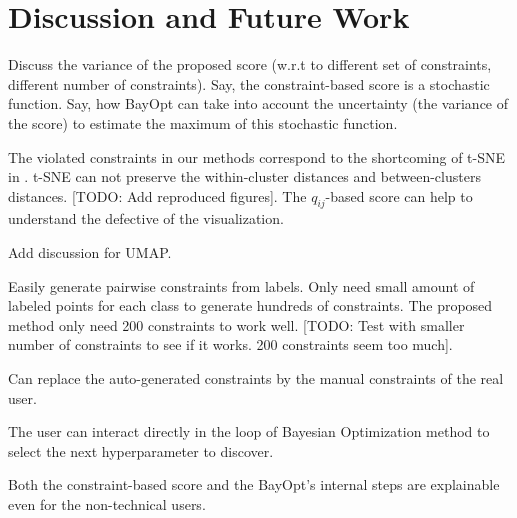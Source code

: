 \begin{figure*}[pos=h]
    \centering
    \texttt{[image: \{NEURON\_1K\_score\_flexibility]}.png}
    \caption{Flexibility of $f_{score}$ for \emph{NEURON\_1K} dataset}
    \label{fig:flex:neuron}
\end{figure*}


\section{Discussion and Future Work}

\par
Discuss the variance of the proposed score (w.r.t to different set of constraints, different number of constraints).
Say, the constraint-based score is a stochastic function.
Say, how BayOpt can take into account the uncertainty (the variance of the score) to estimate the maximum of this stochastic function.


\par
The violated constraints in our methods correspond to the shortcoming of t-SNE in \cite{wattenberg2016use}.
t-SNE can not preserve the within-cluster distances and between-clusters distances.
[TODO: Add reproduced figures].
The $q_{ij}$-based score can help to understand the defective of the visualization.

\par
Add discussion for UMAP.

\par
Easily generate pairwise constraints from labels.
  Only need small amount of labeled points for each class to generate hundreds of constraints.
  The proposed method only need 200 constraints to work well.
  [TODO: Test with smaller number of constraints to see if it works. 200 constraints seem too much].

\par
Can replace the auto-generated constraints by the manual constraints of the real user.

\par
The user can interact directly in the loop of Bayesian Optimization method to select the next hyperparameter to discover.


\par
Both the constraint-based score and the BayOpt's internal steps are explainable even for the non-technical users. 

